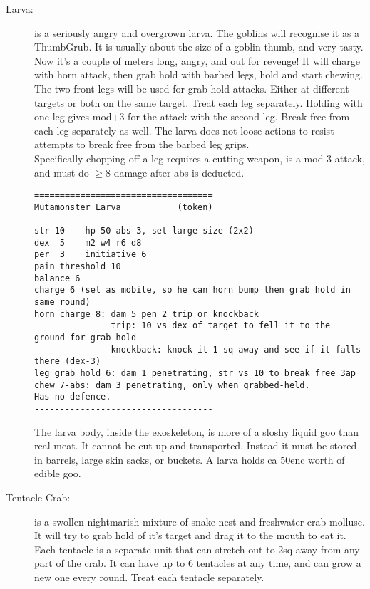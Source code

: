 \begin{description}
\item[Larva:] is a seriously angry and overgrown larva. The goblins will recognise it as a ThumbGrub. It is usually about the size of a goblin thumb, and very tasty. Now it's a couple of meters long, angry, and out for revenge!
It will charge with horn attack, then grab hold with barbed legs, hold and start chewing. The two front legs will be used for grab-hold attacks. Either at different targets or both on the same target. Treat each leg separately. Holding with one leg gives mod+3 for the attack with the second leg. Break free from each leg separately as well. The larva does not loose actions to resist attempts to break free from the barbed leg grips.\\
Specifically chopping off a leg requires a cutting weapon, is a mod-3 attack, and must do $\geq$8 damage after abs is deducted.
\goodbreak \begin{samepage} \small \begin{verbatim}
===================================
Mutamonster Larva           (token)
-----------------------------------
str 10    hp 50 abs 3, set large size (2x2)
dex  5    m2 w4 r6 d8
per  3    initiative 6
pain threshold 10
balance 6
charge 6 (set as mobile, so he can horn bump then grab hold in same round)
horn charge 8: dam 5 pen 2 trip or knockback
               trip: 10 vs dex of target to fell it to the ground for grab hold
               knockback: knock it 1 sq away and see if it falls there (dex-3)
leg grab hold 6: dam 1 penetrating, str vs 10 to break free 3ap
chew 7-abs: dam 3 penetrating, only when grabbed-held.
Has no defence.
-----------------------------------
\end{verbatim} \normalsize \end{samepage}
The larva body, inside the exoskeleton, is more of a sloshy liquid goo than real meat. It cannot be cut up and transported. Instead it must be stored in barrels, large skin sacks, or buckets. A larva holds ca 50enc worth of edible goo.


\item[Tentacle Crab:] is a swollen nightmarish mixture of snake nest and freshwater crab mollusc. It will try to grab hold of it's target and drag it to the mouth to eat it. Each tentacle is a separate unit that can stretch out to 2sq away from any part of the crab. It can have up to 6 tentacles at any time, and can grow a new one every round. Treat each tentacle separately.


\end{description}
